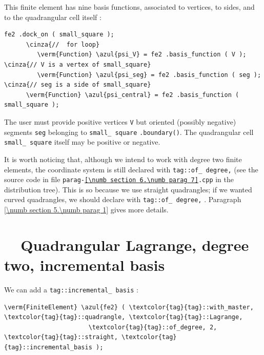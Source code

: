 This finite element has nine basis functions, associated to vertices, to sides, and to the
quadrangular cell itself :

\begin{Verbatim}[commandchars=\\\{\},formatcom=\small\tt,frame=single,
   label=parag-\ref{\numb section 6.\numb parag 7}.cpp,rulecolor=\color{coment},
   baselinestretch=0.94,framesep=2mm                                            ]
      fe2 .dock_on ( small_square );
      \cinza{//  for loop}  
         \verm{Function} \azul{psi_V} = fe2 .basis_function ( V );   \cinza{// V is a vertex of small_square}
         \verm{Function} \azul{psi_seg} = fe2 .basis_function ( seg );  \cinza{// seg is a side of small_square}
      \verm{Function} \azul{psi_central} = fe2 .basis_function ( small_square );
\end{Verbatim}

The user must provide positive vertices {\small\tt V} but oriented (possibly negative) segments
{\small\tt seg} belonging to {\small\tt small\_\,square} {\small\tt .boundary()}.
The quadrangular cell {\small\tt small\_\,square} itself may be positive or negative.

It is worth noticing that, although we intend to work with degree two finite elements,
the coordinate system {\small\tt{}} is still declared with
{\small\tt\textcolor{tag}{tag}::of\_\,degree,} {\small\tt{}}
(see the source code in file {\small\tt parag-\ref{\numb section 6.\numb parag 7}.cpp}
in the distribution tree).
This is so because we use straight quadrangles; if we wanted curved quadrangles, we should
declare {\small\tt{}} with {\small\tt\textcolor{tag}{tag}::of\_\,degree,}
{\small\tt{}}.
Paragraph \ref{\numb section 5.\numb parag 1} gives more details.


\section{~~Quadrangular Lagrange, degree two, incremental basis}
\label{\numb section 6.\numb parag 8}

We can add a {\small\tt\textcolor{tag}{tag}::incremental\_\,basis} :

\begin{Verbatim}[commandchars=\\\{\},formatcom=\small\tt,frame=single,
   label=parag-\ref{\numb section 6.\numb parag 8}.cpp,rulecolor=\color{coment},
   baselinestretch=0.94,framesep=2mm                                            ]
   \verm{FiniteElement} \azul{fe2} ( \textcolor{tag}{tag}::with_master, \textcolor{tag}{tag}::quadrangle, \textcolor{tag}{tag}::Lagrange,
                       \textcolor{tag}{tag}::of_degree, 2, \textcolor{tag}{tag}::straight, \textcolor{tag}{tag}::incremental_basis );
\end{Verbatim}

